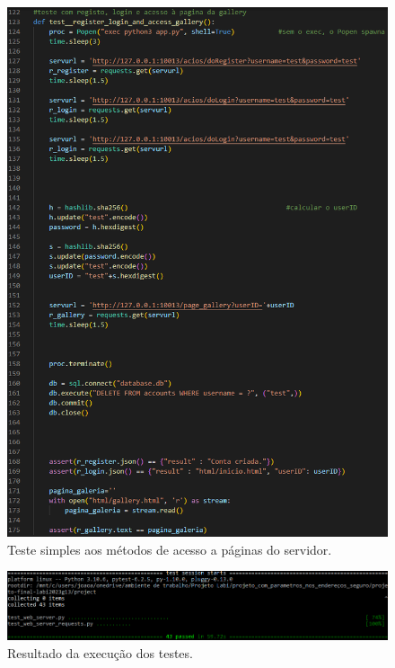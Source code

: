 \documentclass{report}
\begin{document}
    \begin{figure}[!hbtp]
        \centering 
        \includegraphics[scale=0.7]{Images_code/15 - testes 6.png}
        \caption{\label{Testes}Teste simples aos métodos de acesso a páginas do servidor.}
    \end{figure}

    \begin{figure}[!hbtp]
        \centering 
        \includegraphics[scale=0.54]{Images_code/16 - teste resultado.png}
        \caption{\label{Testes}Resultado da execução dos testes.}
    \end{figure}
    
\end{document}
